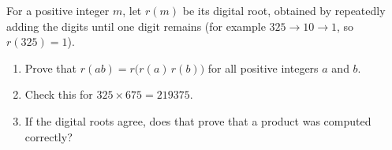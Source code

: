 For a positive integer $m$, let $r(m)$ be its digital root, obtained by repeatedly adding the digits until one digit remains (for example $325\to10\to1$, so $r(325)=1$).
\begin{enumerate}
\item[(a)] Prove that $r(ab)=r\bigl(r(a)\,r(b)\bigr)$ for all positive integers $a$ and $b$.
\item[(b)] Check this for $325\times675=219375$.
\item[(c)] If the digital roots agree, does that prove that a product was computed correctly?
\end{enumerate}

